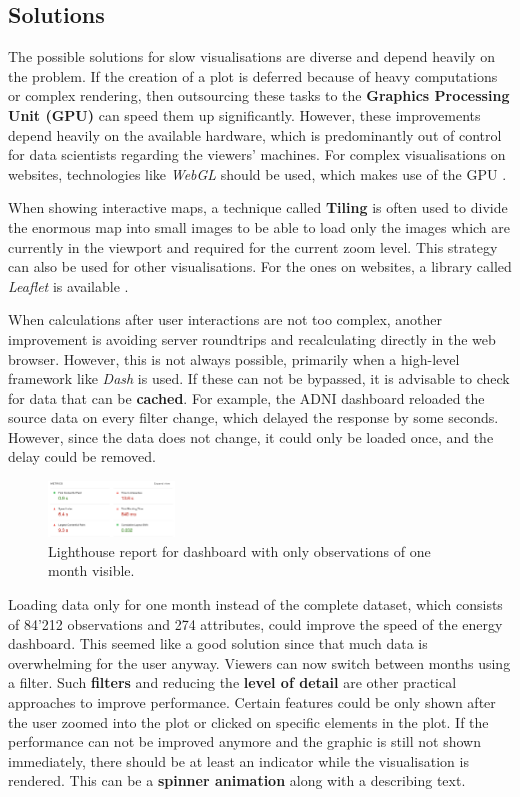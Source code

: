 \documentclass[11pt]{article}
\begin{document}
\subsection{Solutions}

The possible solutions for slow visualisations are diverse and depend heavily on the problem. If the creation of a plot is deferred because of heavy computations or complex rendering, then outsourcing these tasks to the \textbf{Graphics Processing Unit (GPU)} can speed them up significantly. However, these improvements depend heavily on the available hardware, which is predominantly out of control for data scientists regarding the viewers' machines. For complex visualisations on websites, technologies like \textit{WebGL} should be used, which makes use of the GPU \parencite{mozilla_webgl_2022}.

When showing interactive maps, a technique called \textbf{Tiling} is often used to divide the enormous map into small images to be able to load only the images which are currently in the viewport and required for the current zoom level. This strategy can also be used for other visualisations. For the ones on websites, a library called \textit{Leaflet} is available \parencite{noauthor_leaflet_2022}.

When calculations after user interactions are not too complex, another improvement is avoiding server roundtrips and recalculating directly in the web browser. However, this is not always possible, primarily when a high-level framework like \textit{Dash} is used. If these can not be bypassed, it is advisable to check for data that can be \textbf{cached}. For example, the ADNI dashboard reloaded the source data on every filter change, which delayed the response by some seconds. However, since the data does not change, it could only be loaded once, and the delay could be removed.

\begin{figure}
    \includegraphics[width=0.3\textwidth]{./lighthouse-2.png}
    \caption{Lighthouse report for dashboard with only observations of one month visible.}
\end{figure}

Loading data only for one month instead of the complete dataset, which consists of 84'212 observations and 274 attributes, could improve the speed of the energy dashboard. This seemed like a good solution since that much data is overwhelming for the user anyway. Viewers can now switch between months using a filter. Such \textbf{filters} and reducing the \textbf{level of detail} are other practical approaches to improve performance. Certain features could be only shown after the user zoomed into the plot or clicked on specific elements in the plot. If the performance can not be improved anymore and the graphic is still not shown immediately, there should be at least an indicator while the visualisation is rendered. This can be a \textbf{spinner animation} along with a describing text.
\end{document}
